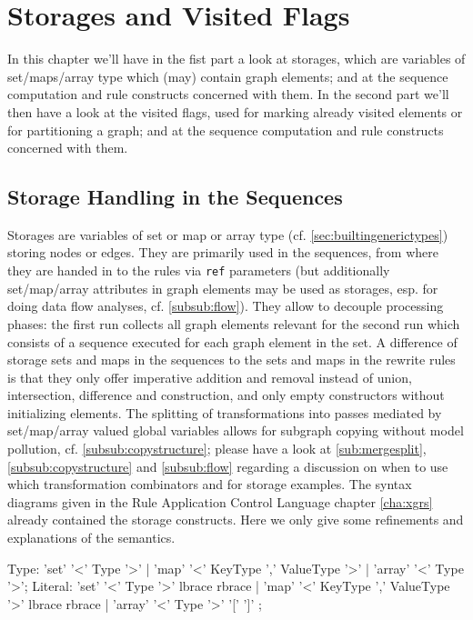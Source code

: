 \chapter{Storages and Visited Flags}
\label{cha:storagesvisited}

In this chapter we'll have in the fist part a look at storages,
which are variables of set/maps/array type which (may) contain graph elements;
and at the sequence computation and rule constructs concerned with them.
In the second part we'll then have a look at the visited flags, 
used for marking already visited elements or for partitioning a graph;
and at the sequence computation and rule constructs concerned with them.

\section{Storage Handling in the Sequences}\label{sec:storages}

Storages are variables of set or map or array type (cf. \ref{sec:builtingenerictypes}) storing nodes or edges.
They are primarily used in the sequences, from where they are handed in to the rules via \texttt{ref} parameters (but additionally set/map/array attributes in graph elements may be used as storages,
esp. for doing data flow analyses, cf. \ref{subsub:flow}).
They allow to decouple processing phases: the first run collects all graph elements relevant for the second run which consists of a sequence executed for each graph element in the set.
A difference of storage sets and maps in the sequences to the sets and maps in the rewrite rules is that they only offer imperative addition and removal instead of union, intersection, difference and construction, and only empty constructors without initializing elements.
The splitting of transformations into passes mediated by set/map/array valued global variables allows for subgraph copying without model pollution, cf. \ref{subsub:copystructure}; please have a look at \ref{sub:mergesplit}, \ref{subsub:copystructure} and \ref{subsub:flow} regarding a discussion on when to use which transformation combinators and for storage examples.
The syntax diagrams given in the Rule Application Control Language chapter \ref{cha:xgrs} already contained the storage constructs.
Here we only give some refinements and explanations of the semantics.

\begin{rail}
  Type: 'set' '<' Type '>'
    | 'map' '<' KeyType ',' ValueType '>'
    | 'array' '<' Type '>';
  Literal:
    'set' '<' Type '>' lbrace rbrace |
    'map' '<' KeyType ',' ValueType '>' lbrace rbrace |
    'array' '<' Type '>' '[' ']'
	;
\end{rail}%

